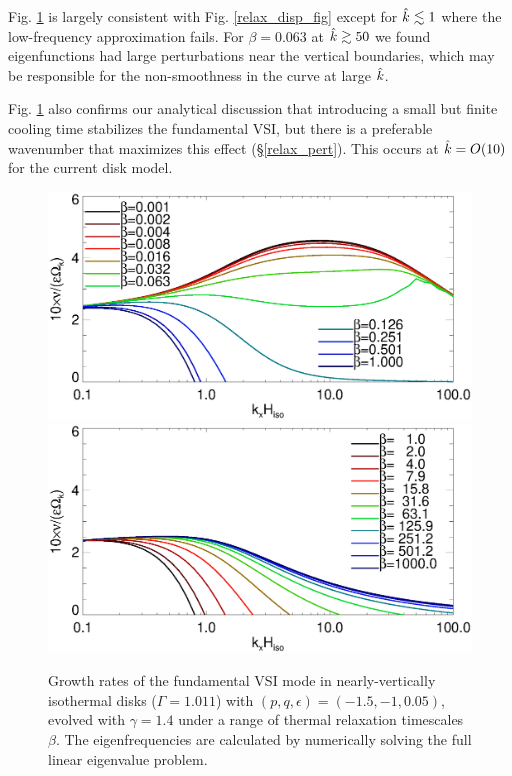 
Fig. \ref{relax_growth_num} is largely consistent with 
Fig. \ref{relax_disp_fig} except for $\hat{k}\lesssim 1$
where the low-frequency approximation fails. 
For $\beta=0.063$ at $\hat{k}\gtrsim50$ we found eigenfunctions had 
large perturbations near the vertical boundaries, which may be 
responsible for the non-smoothness in the curve at large $\hat{k}$. 


Fig. \ref{relax_growth_num} also confirms our analytical discussion that
introducing a small but finite cooling time stabilizes the fundamental
VSI, but there is a preferable wavenumber that maximizes this effect (\S\ref{relax_pert}).
This occurs at $\hat{k}= O(10)$ for the current disk model. 

\begin{figure}
   \includegraphics[width=\linewidth,clip=true,trim=0cm 1.75cm 0cm
   0cm]{figures/compare_eigen_imag_bloop} 
  \includegraphics[width=\linewidth,clip=true,trim=0cm 0cm 0cm
  1cm]{figures/compare_eigen_imag_bloop2} 
  \caption{Growth rates of the fundamental VSI mode in 
    nearly-vertically isothermal disks ($\Gamma=1.011$) with
    $(p,q,\epsilon)=(-1.5,-1,0.05)$, evolved with $\gamma=1.4$ under a
    range of thermal relaxation timescales   
    $\beta$. The eigenfrequencies are calculated by numerically 
    solving the full linear eigenvalue problem. \label{relax_growth_num}}   
\end{figure}   

